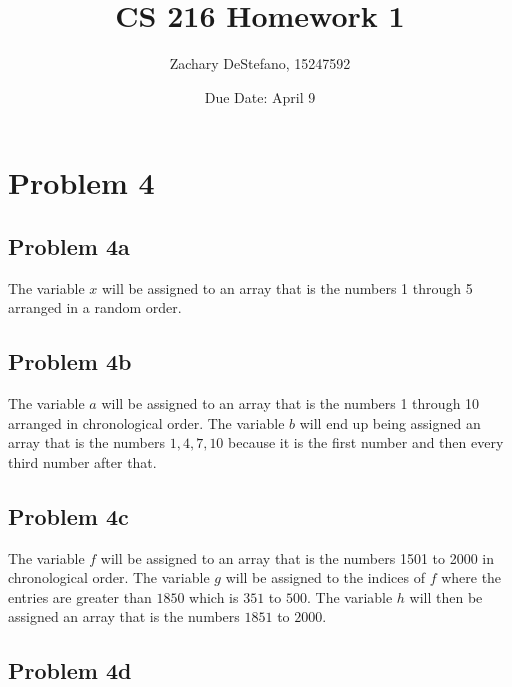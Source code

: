 \documentclass[11pt,psfig]{article}
\begin{document}
\setlength{\parskip}{1.2ex plus0.3ex minus 0.3ex}


\thispagestyle{empty} \pagestyle{myheadings} 



\title{CS 216 Homework 1}
\author{Zachary DeStefano, 15247592}
\date{Due Date: April 9}

\maketitle

\vfill\eject

\section*{Problem 4}

\subsection*{Problem 4a}

The variable $x$ will be assigned to an array that is the numbers 1 through 5 arranged in a random order. 

\subsection*{Problem 4b}

The variable $a$ will be assigned to an array that is the numbers 1 through 10 arranged in chronological order. The variable $b$ will end up being assigned an array that is the numbers $1,4,7,10$ because it is the first number and then every third number after that. 

\subsection*{Problem 4c}

The variable $f$ will be assigned to an array that is the numbers 1501 to 2000 in chronological order. The variable $g$ will be assigned to the indices of $f$ where the entries are greater than $1850$ which is $351$ to $500$. The variable $h$ will then be assigned an array that is the numbers $1851$ to $2000$.  

\subsection*{Problem 4d}
\end{document}
